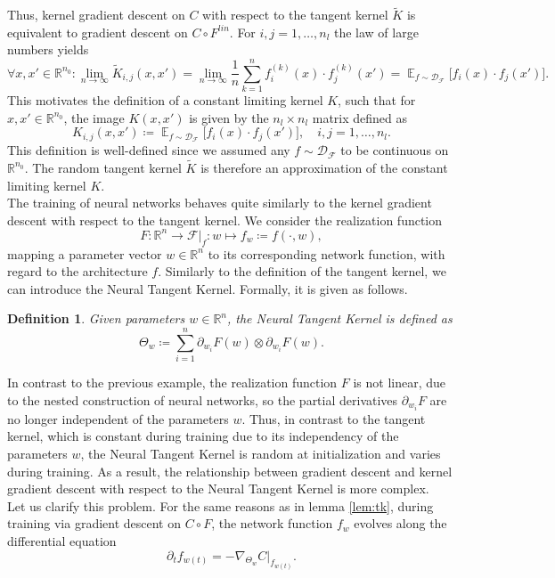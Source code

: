 \documentclass[11pt, a4paper]{article}
\newtheorem{definition}[theorem]{Definition}
\newcommand{\R}{\mathbb{R}}
\newcommand{\D}{\mathcal{D}}
\newcommand{\F}{\mathcal{F}}
\DeclareMathOperator*{\E}{\mathbb{E}}
\begin{document}
Thus, kernel gradient descent on $C$ with respect to the tangent kernel $\tilde{K}$ is equivalent to gradient descent on $C \circ F^\textit{lin}$. For $i,j = 1, \dots, n_l$ the law of large numbers yields
\[ \forall x,x' \in \R^{n_0} : \lim_{n \to \infty} \tilde{K}_{i,j}(x,x') = \lim_{n \to \infty} \frac{1}{n} \sum_{k=1}^{n} f_i^{(k)}(x) \cdot f_j^{(k)}(x') = \E_{f \sim \D_{\F}} \Big [ f_i(x) \cdot f_j(x') \Big ]. \]
This motivates the definition of a constant limiting kernel $K$, such that for $x,x' \in \R^{n_0}$, the image $K(x,x')$ is given by the $n_l \times n_l$ matrix defined as
\[ K_{i,j}(x,x') \coloneq \E_{f \sim \D_{\F}} \Big [ f_i(x) \cdot f_j(x') \Big ], \quad i,j=1,\dots,n_l. \]
This definition is well-defined since we assumed any $f \sim \D_\F$ to be continuous on $\R^{n_0}$. The random tangent kernel $\tilde{K}$ is therefore an approximation of the constant limiting kernel $K$. \\

The training of neural networks behaves quite similarly to the kernel gradient descent with respect to the tangent kernel. We consider the realization function
\[ F: \R^n \to \F|_{f} : w \mapsto f_w \coloneq f(\cdot,w), \]
mapping a parameter vector $w \in \R^n$ to its corresponding network function, with regard to the architecture $f$. Similarly to the definition of the tangent kernel, we can introduce the Neural Tangent Kernel. Formally, it is given as follows.
 
\begin{definition} \label{def:ntk}
Given parameters $w \in \R^n$, the Neural Tangent Kernel is defined as
\[ \Theta_w \coloneq \sum_{i=1}^{n} \partial_{w_i} F(w) \otimes \partial_{w_i} F(w). \]
\end{definition}

In contrast to the previous example, the realization function $F$ is not linear, due to the nested construction of neural networks, so the partial derivatives $\partial_{w_i}F$ are no longer independent of the parameters $w$. Thus, in contrast to the tangent kernel, which is constant during training due to its independency of the parameters $w$, the Neural Tangent Kernel is random at initialization and varies during training. As a result, the relationship between gradient descent and kernel gradient descent with respect to the Neural Tangent Kernel is more complex. \\

Let us clarify this problem. For the same reasons as in lemma \ref{lem:tk}, during training via gradient descent on $C \circ F$, the network function $f_w$ evolves along the differential equation
\[ \partial_tf_{w(t)} = -\nabla_{\Theta_w}C|_{f_{w(t)}}. \]
\end{document}
